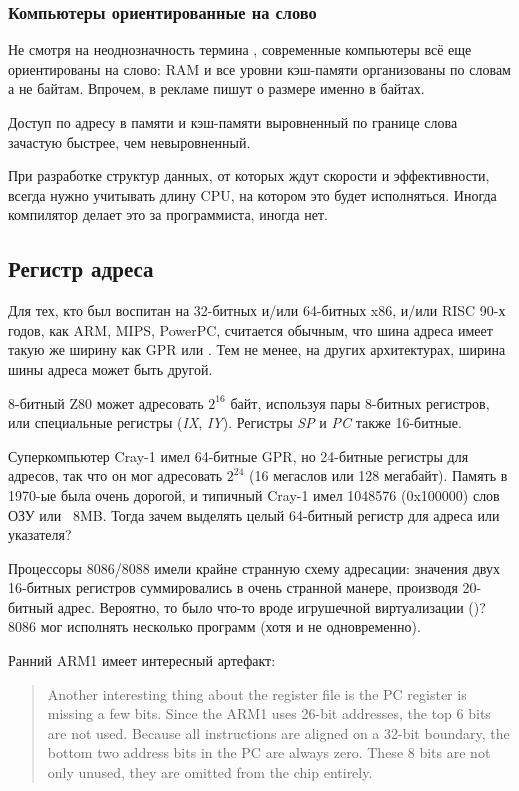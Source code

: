 \subsubsection{Компьютеры ориентированные на слово}

Не смотря на неоднозначность термина , современные компьютеры всё еще ориентированы на слово:
\ac{RAM} и все уровни кэш-памяти организованы по словам а не байтам.
Впрочем, в рекламе пишут о размере именно в байтах.

Доступ по адресу в памяти и кэш-памяти выровненный по границе слова зачастую быстрее, чем невыровненный.

При разработке структур данных, от которых ждут скорости и эффективности, всегда нужно учитывать длину 
CPU, на котором это будет исполняться.
Иногда компилятор делает это за программиста, иногда нет.

\subsection{Регистр адреса}

Для тех, кто был воспитан на 32-битных и/или 64-битных x86, и/или RISC 90-х годов, как ARM, MIPS, PowerPC, считается
обычным, что шина адреса имеет такую же ширину как \ac{GPR} или .
Тем не менее, на других архитектурах, ширина шины адреса может быть другой.

8-битный Z80 может адресовать $2^{16}$ байт, используя пары 8-битных регистров, или специальные регистры (\emph{IX}, \emph{IY}).
Регистры \emph{SP} и \emph{PC} также 16-битные.

Суперкомпьютер Cray-1 имел 64-битные GPR, но 24-битные регистры для адресов, так что он мог адресовать
$2^{24}$ (16 мегаслов или 128 мегабайт).
Память в 1970-ые была очень дорогой, и типичный Cray-1 имел 1048576 (0x100000) слов ОЗУ или ~8MB.
Тогда зачем выделять целый 64-битный регистр для адреса или указателя?

Процессоры 8086/8088 имели крайне странную схему адресации:
значения двух 16-битных регистров суммировались в очень странной манере, производя 20-битный адрес.
Вероятно, то было что-то вроде игрушечной виртуализации ()?
8086 мог исполнять несколько программ (хотя и не одновременно).

Ранний ARM1 имеет интересный артефакт:

\begin{framed}
\begin{quotation}
Another interesting thing about the register file is the PC register is missing a few bits. Since the ARM1 uses 26-bit addresses, the top 6 bits are not used. Because all instructions are aligned on a 32-bit boundary, the bottom two address bits in the PC are always zero. These 8 bits are not only unused, they are omitted from the chip entirely.
\end{quotation}
\end{framed}

